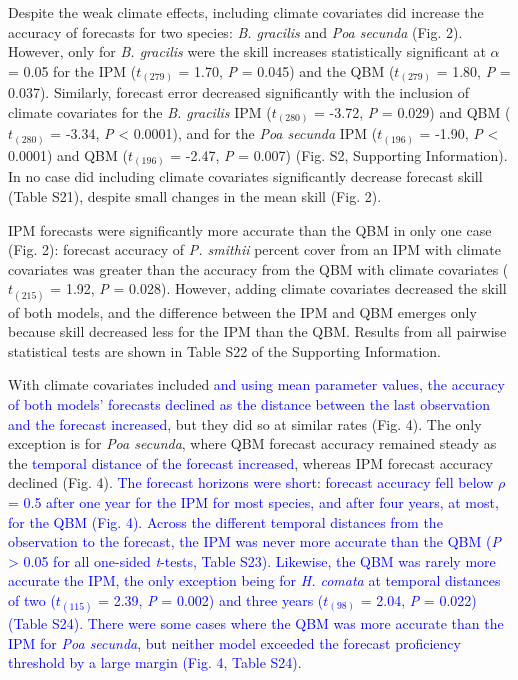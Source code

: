 \documentclass[12pt,]{article}
\begin{document}
Despite the weak climate effects, including climate covariates did
increase the accuracy of forecasts for two species: \emph{B. gracilis}
and \emph{Poa secunda} (Fig. 2). However, only for \emph{B. gracilis}
were the skill increases statistically significant at \(\alpha\) = 0.05
for the IPM (\(t_{(279)}\) = 1.70, \emph{P} = 0.045) and the QBM
(\(t_{(279)}\) = 1.80, \emph{P} = 0.037). Similarly, forecast error
decreased significantly with the inclusion of climate covariates for the
\emph{B. gracilis} IPM (\(t_{(280)}\) = -3.72, \emph{P} = 0.029) and QBM
(\(t_{(280)}\) = -3.34, \emph{P} \textless{} 0.0001), and for the
\emph{Poa secunda} IPM (\(t_{(196)}\) = -1.90, \emph{P} \textless{}
0.0001) and QBM (\(t_{(196)}\) = -2.47, \emph{P} = 0.007) (Fig. S2,
Supporting Information). In no case did including climate covariates
significantly decrease forecast skill (Table S21), despite small changes
in the mean skill (Fig. 2).

IPM forecasts were significantly more accurate than the QBM in only one
case (Fig. 2): forecast accuracy of \emph{P. smithii} percent cover from
an IPM with climate covariates was greater than the accuracy from the
QBM with climate covariates (\(t_{(215)}\) = 1.92, \emph{P} = 0.028).
However, adding climate covariates decreased the skill of both models,
and the difference between the IPM and QBM emerges only because skill
decreased less for the IPM than the QBM. Results from all pairwise
statistical tests are shown in Table S22 of the Supporting Information.

With climate covariates included
\textcolor{blue}{and using mean parameter values, the accuracy of both models' forecasts declined as the distance between the last observation and the forecast increased},
but they did so at similar rates (Fig. 4). The only exception is for
\emph{Poa secunda}, where QBM forecast accuracy remained steady as the
\textcolor{blue}{temporal distance of the forecast increased}, whereas
IPM forecast accuracy declined (Fig. 4).
\textcolor{blue}{The forecast horizons were short: forecast accuracy fell below $\rho$ = 0.5 after one year for the IPM for most species, and after four years, at most, for the QBM (Fig. 4).
Across the different temporal distances from the observation to the forecast, the IPM was never more accurate than the QBM (\emph{P} > 0.05 for all one-sided \emph{t}-tests, Table S23).
Likewise, the QBM was rarely more accurate the IPM, the only exception being for \emph{H. comata} at temporal distances of two ($t_{(115)}$ = 2.39, \emph{P} = 0.002) and three years ($t_{(98)}$ = 2.04, \emph{P} = 0.022) (Table S24).
There were some cases where the QBM was more accurate than the IPM for \emph{Poa secunda}, but neither model exceeded the forecast proficiency threshold by a large margin (Fig. 4, Table S24).}
\end{document}
